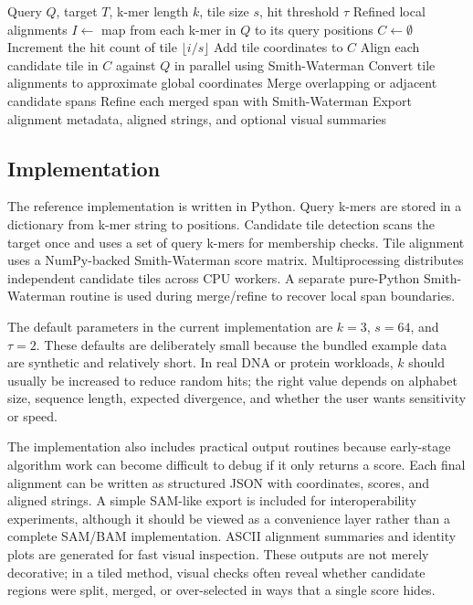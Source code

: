 \documentclass[11pt]{article}
\begin{document}
\begin{algorithm}[ht]
\caption{SWIFT local alignment workflow}
\begin{algorithmic}[1]
\Require Query $Q$, target $T$, k-mer length $k$, tile size $s$, hit threshold $\tau$
\Ensure Refined local alignments
\State $I \gets$ map from each k-mer in $Q$ to its query positions
\State $C \gets \emptyset$
    \State Increment the hit count of tile $\lfloor i/s \rfloor$
  \EndIf
\EndFor
{}
  \State Add tile coordinates to $C$
\EndFor
\State Align each candidate tile in $C$ against $Q$ in parallel using Smith-Waterman
\State Convert tile alignments to approximate global coordinates
\State Merge overlapping or adjacent candidate spans
\State Refine each merged span with Smith-Waterman
\State Export alignment metadata, aligned strings, and optional visual summaries
\end{algorithmic}
\end{algorithm}

\subsection{Implementation}
The reference implementation is written in Python. Query k-mers are stored in a dictionary from k-mer string to positions. Candidate tile detection scans the target once and uses a set of query k-mers for membership checks. Tile alignment uses a NumPy-backed Smith-Waterman score matrix. Multiprocessing distributes independent candidate tiles across CPU workers. A separate pure-Python Smith-Waterman routine is used during merge/refine to recover local span boundaries.

The default parameters in the current implementation are $k=3$, $s=64$, and $\tau=2$. These defaults are deliberately small because the bundled example data are synthetic and relatively short. In real DNA or protein workloads, $k$ should usually be increased to reduce random hits; the right value depends on alphabet size, sequence length, expected divergence, and whether the user wants sensitivity or speed.

The implementation also includes practical output routines because early-stage algorithm work can become difficult to debug if it only returns a score. Each final alignment can be written as structured JSON with coordinates, scores, and aligned strings. A simple SAM-like export is included for interoperability experiments, although it should be viewed as a convenience layer rather than a complete SAM/BAM implementation. ASCII alignment summaries and identity plots are generated for fast visual inspection. These outputs are not merely decorative; in a tiled method, visual checks often reveal whether candidate regions were split, merged, or over-selected in ways that a single score hides.
\end{document}
